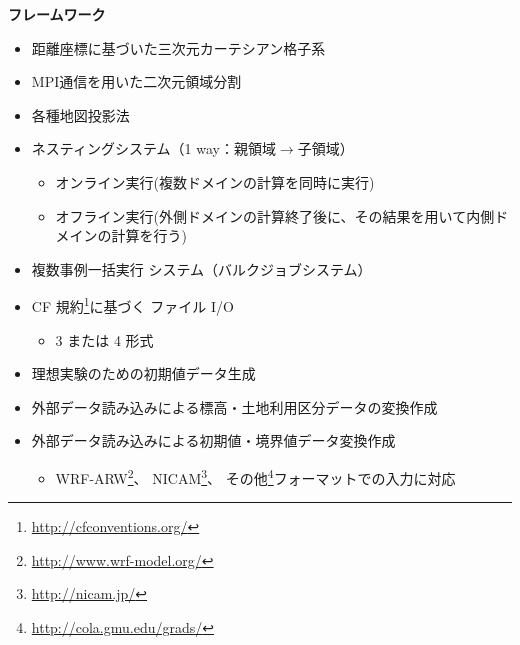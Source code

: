 {\bf フレームワーク}
\begin{itemize}
 \item 距離座標に基づいた三次元カーテシアン格子系
 \item MPI通信を用いた二次元領域分割
 \item 各種地図投影法
 \item ネスティングシステム（1 way：親領域$\to$子領域）
   \begin{itemize}
    \item オンライン実行(複数ドメインの計算を同時に実行)
    \item オフライン実行(外側ドメインの計算終了後に、その結果を用いて内側ドメインの計算を行う)
   \end{itemize}
 \item 複数事例一括実行 システム（バルクジョブシステム）
 \item CF 規約\footnote{\url{http://cfconventions.org/}}に基づく \netcdf ファイル I/O
   \begin{itemize}
   \item {\netcdf}3 または {\netcdf}4 形式
   \end{itemize}
 \item 理想実験のための初期値データ生成
 \item 外部データ読み込みによる標高・土地利用区分データの変換作成
 \item 外部データ読み込みによる初期値・境界値データ変換作成
   \begin{itemize}
    \item WRF-ARW\footnote{\url{http://www.wrf-model.org/}}、
      NICAM\footnote{\url{http://nicam.jp/}}、
      その他\grads \footnote{\url{http://cola.gmu.edu/grads/}}フォーマットでの入力に対応
   \end{itemize}
\end{itemize}

